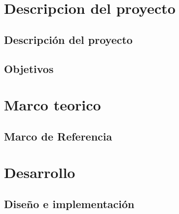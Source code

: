 \documentclass[11pt,openany,oneside,letterpaper]{book}
\begin{document}
\frontmatter

\tableofcontents



\mainmatter

\part{Descripcion del proyecto}

\chapter{Descripción del proyecto}



\chapter{Objetivos}



\part{Marco teorico}

\chapter{Marco de Referencia}


\part{Desarrollo}
\chapter{Diseño e implementación}






\backmatter




\end{document}
